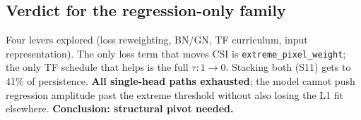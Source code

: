 \subsection*{Verdict for the regression-only family}
Four levers explored (loss reweighting, BN/GN, TF curriculum,
input representation). The only loss term that moves CSI is
\texttt{extreme\_pixel\_weight}; the only TF schedule that helps is
the full \(\tau{:}1\!\to\!0\). Stacking both (S11) gets to 41\% of
persistence. \textbf{All single-head paths exhausted}; the model
cannot push regression amplitude past the extreme threshold without
also losing the L1 fit elsewhere.
\textbf{Conclusion: structural pivot needed.}
